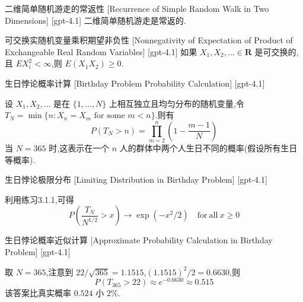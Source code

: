 \documentclass[UTF8]{ctexart}
\begin{document}
    
    
    \begin{thm}
        {二维简单随机游走的常返性}
        [Recurrence of Simple Random Walk in Two Dimensions]
        [gpt-4.1]
        二维简单随机游走是常返的.
    \end{thm}
    
    
    
    \begin{thm}
        {可交换实随机变量乘积期望非负性}
        [Nonnegativity of Expectation of Product of Exchangeable Real Random Variables]
        [gpt-4.1]
        如果 $X_{1}, X_{2}, \dotsc \in \mathbf{R}$ 是可交换的,且 $E X_{i}^{2} < \infty$,则 $E(X_{1} X_{2}) \geq 0$.
    \end{thm}
    
    
    
    \begin{xmp}
        {生日悖论概率计算}
        [Birthday Problem Probability Calculation]
        [gpt-4.1]
        
设 $X_{1}, X_{2}, \dots$ 是在 $\{1, \ldots, N\}$ 上相互独立且均匀分布的随机变量,令 $T_{N} = \operatorname*{min}\{n : X_{n} = X_{m} \text{ for some } m < n\}$.则有
\[
P(T_{N} > n) = \prod_{m=2}^{n} \left(1 - \frac{m-1}{N}\right)
\]
当 $N = 365$ 时,这表示在一个 $n$ 人的群体中两个人生日不同的概率(假设所有生日等概率).

    \end{xmp}
    
    
    
    \begin{crl}
        {生日悖论极限分布}
        [Limiting Distribution in Birthday Problem]
        [gpt-4.1]
        
利用练习3.1.1,可得
\[
P\left(\frac{T_{N}}{N^{1/2}} > x\right) \to \exp(-x^{2}/2) \quad \mathrm{for\ all\ } x \geq 0
\]

    \end{crl}
    
    
    
    \begin{xmp}
        {生日悖论概率近似计算}
        [Approximate Probability Calculation in Birthday Problem]
        [gpt-4.1]
        
取 $N = 365$,注意到 $22 / \sqrt{365} = 1.1515$,$(1.1515)^{2}/2 = 0.6630$,则
\[
P(T_{365} > 22) \approx e^{-0.6630} \approx 0.515
\]
该答案比真实概率 $0.524$ 小 $2\%$.

    \end{xmp}
    
\end{document}
